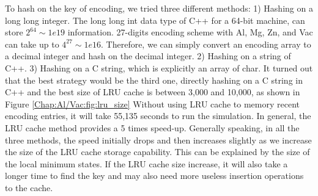 To hash on the key of encoding, we tried three different methods: 1) Hashing on a long long integer. The long long int data type of C++ for a 64-bit machine, can store $2^{64} \sim 1e19$ information. 27-digits encoding scheme with Al, Mg, Zn, and Vac can take up to $4^{27} \sim 1e16$. Therefore, we can simply convert an encoding array to a decimal integer and hash on the decimal integer. 2) Hashing on a string of C++. 3) Hashing on a C string, which is explicitly an array of char. It turned out that the best strategy would be the third one, directly hashing on a C string in C++ and the best size of \ac{LRU} cache is between 3,000 and 10,000, as shown in Figure \ref{Chap:Al/Vac:fig:lru_size} Without using \ac{LRU} cache to memory recent encoding entries, it will take 55,135 seconds to run the simulation. In general, the \ac{LRU} cache method provides a 5 times speed-up. Generally speaking, in all the three methods, the speed initially drops and then increases slightly as we increase the size of the \ac{LRU} cache storage capability. This can be explained by the size of the local minimum states. If the \ac{LRU} cache size increase, it will also take a longer time to find the key and may also need more useless insertion operations to the cache.


